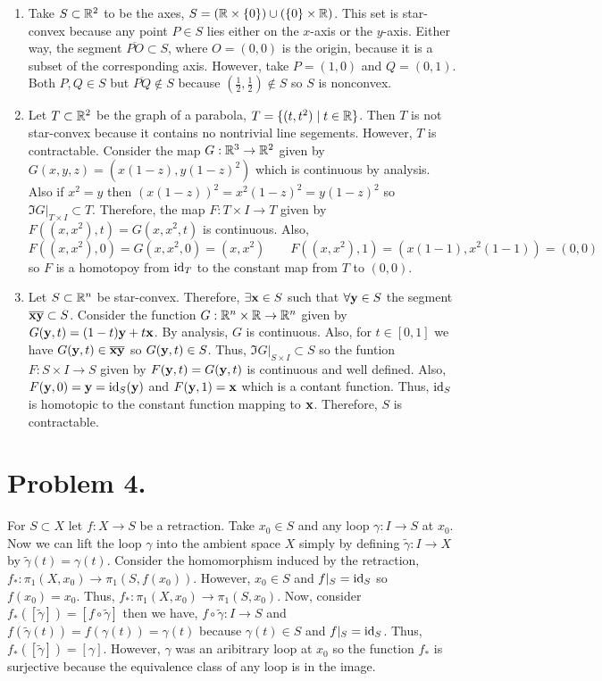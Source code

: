 \documentclass[12pt]{extarticle}
\begin{document}
\begin{enumerate}
\item Take $S \subset \R^2$ to be the axes, $S = (\R \times \{0\}) \cup (\{0\} \times \R)$. This set is star-convex because any point $P \in S$ lies either on the $x$-axis or the $y$-axis. Either way, the segment $\overline{PO} \subset S$, where $O = (0,0)$ is the origin, because it is a subset of the corresponding axis. However, take $P = (1, 0)$ and $Q = (0, 1)$. Both $P, Q \in S$ but $\overline{PQ} \notin S$ because $(\tfrac{1}{2}, \tfrac{1}{2}) \notin S$ so $S$ is nonconvex.  

\item Let $T \subset \R^2$ be the graph of a parabola, $T = \{ (t, t^2) \mid t \in \R \}$. Then $T$ is not star-convex because it contains no nontrivial line segements. However, $T$ is contractable. Consider the map $G : \R^3 \to \R^2$ given by $G(x, y, z) = (x (1 - z), y (1 - z)^2)$ which is continuous by analysis. Also if $x^2 = y$ then $(x(1-z))^2 = x^2 (1 - z)^2 = y (1 - z)^2$ so $\Im{G|_{T \times I}} \subset T$. Therefore, the map $F : T \times I \to T$ given by $F((x,x^2), t) = G(x, x^2, t)$ is continuous. Also, \[F((x, x^2), 0) = G(x, x^2, 0) = (x, x^2) \quad \quad  F((x, x^2), 1)  = (x(1-1), x^2(1-1)) = (0, 0)\] so $F$ is a homotopoy from $\id_T$ to the constant map from $T$ to $(0,0)$. 

\item Let $S \subset \R^n$ be star-convex. Therefore, $\exists \bf{x} \in S$ such that $\forall \bf{y} \in S$ the segment $\overline{\bf{xy}} \subset S$. Consider the function   $G : \R^{n} \times \R \to \R^{n}$ given by $G(\bf{y}, t) = (1 - t) \bf{y} + t \bf{x}$. By analysis, $G$ is continuous. Also, for $t \in [0,1]$ we have $G(\bf{y}, t) \in \overline{\bf{xy}}$ so $G(\bf{y}, t) \in S$. Thus, $\Im{G|_{S \times I}} \subset S$ so the funtion $F : S \times I \to S$ given by $F(\bf{y}, t) = G(\bf{y}, t)$ is continuous and well defined. Also, $F(\bf{y}, 0) = \bf{y} = \id_S(\bf{y})$ and $F(\bf{y}, 1) = \bf{x}$ which is a contant function. Thus, $\id_S$ is homotopic to the constant function mapping to $\bf{x}$. Therefore, $S$ is contractable.     
\end{enumerate}

\section*{Problem 4.}
For $S \subset X$ let $f : X \to S$ be a retraction. Take $x_0 \in S$ and any loop $\gamma : I \to S$ at $x_0$. Now we can lift the loop $\gamma$ into the ambient space $X$ simply by defining $\tilde{\gamma} : I \to X$ by $\tilde{\gamma}(t) = \gamma(t)$. Consider the homomorphism induced by the retraction, $f_* : \pi_1(X, x_0) \to \pi_1(S, f(x_0))$. However, $x_0 \in S$ and $f|_S = \id_S$ so $f(x_0) = x_0$. Thus, $f_* : \pi_1(X, x_0) \to \pi_1(S, x_0)$. Now, consider $f_*([\tilde{\gamma}]) = [f \circ \tilde{\gamma}]$ then we have, $f \circ \tilde{\gamma} : I \to S$ and $f(\tilde{\gamma}(t)) = f(\gamma(t)) = \gamma(t)$ because $\gamma(t) \in S$ and $f|_S = \id_S$. Thus, $f_*([\tilde{\gamma}]) = [\gamma]$. However, $\gamma$ was an aribitrary loop at $x_0$ so the function $f_*$ is surjective because the equivalence class of any loop is in the image. 
\end{document}
